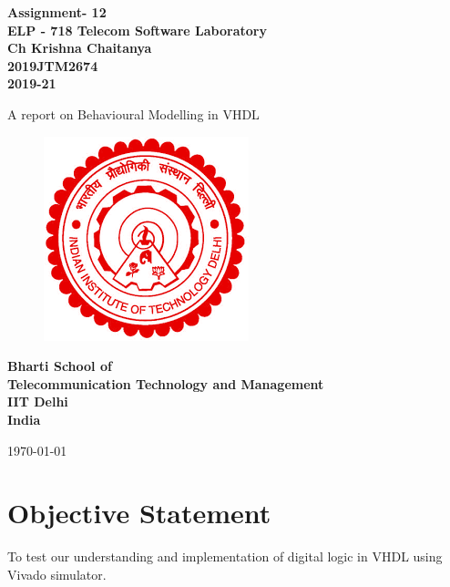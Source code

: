 \documentclass[12pt]{article}
\begin{document}
  \begin{titlepage}
    \begin{center}
      \begin{Large}
      \textbf{ Assignment- 12\\
       \vspace*{0.5cm}
       ELP - 718 Telecom Software Laboratory\\
       \vspace{1cm}
       Ch Krishna Chaitanya\\
       2019JTM2674\\
       2019-21\\}
      \end{Large}
       \vspace{1cm}
      {\Large  A report on Behavioural Modelling in VHDL}
       \vfill
       \begin{figure}[h!]
          \centering
          \includegraphics{iitdelhi.png}
       \end{figure}
       \vfill
      \begin{Large}
      \textbf{ Bharti School of \\
       Telecommunication Technology and Management\\
       IIT Delhi\\
       India\\
      }\end{Large}
       \medskip
       \today
    \end{center}
    \vfill
  \end{titlepage}
  
  \tableofcontents
  
  \clearpage
  \section*{Objective Statement}
   To test our understanding and implementation of digital logic in VHDL using Vivado simulator.
\end{document}
